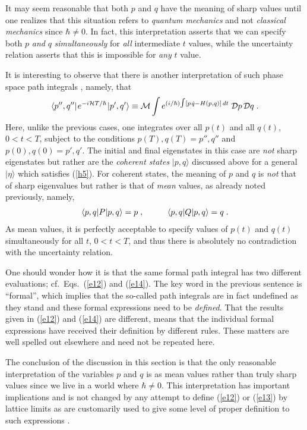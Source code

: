 \documentclass[12pt]{article}
\def\H{{\cal H}}
\def\D{{\cal D}}
\def\tint{{\textstyle\int}}
\def\s{\hskip.08em}
\def\bn{\begin{eqnarray}}     %
\def\en{\end{eqnarray}}       %
\def\<{\langle}
\def\>{\rangle}
\begin{document}
It may seem reasonable that both $p$ and $q$ have the meaning of sharp 
values until one realizes that this situation refers to 
{\it quantum mechanics} and not {\it classical mechanics} since 
$\hbar\not=0$. In fact, this interpretation asserts that we can specify 
both $p$ {\it and} $q$ {\it simultaneously} for {\it all} intermediate 
$t$ values, while the uncertainty relation asserts that this is impossible 
for {\it any} $t$ value. 

It is interesting to observe that there is another interpretation of 
such phase space path integrals \cite{kla60,klabs}, namely, that
  \bn \<p'',q''|\s e^{-i\H T/\hbar}\s|p',q'\>\equiv {\cal M}\int 
e^{(i/\hbar)\tint[p\s{\dot q}-H(p,q)]\,dt}\;\D p\,\D q\;.   \label{e14}\en
Here, unlike the previous cases, one integrates over all $p(t)$ and all 
$q(t)$,
$0<t<T$, subject to the conditions $p(T),q(T)=p'',q''$ and $p(0),q(0)=p',q'$.
The initial and final eigenstates in this case are {\it not} sharp 
eigenstates but rather are the {\it coherent states} $|p,q\>$ discussed 
above for a general $|\eta\>$ which satisfies (\ref{h5}). For coherent 
states, the meaning of $p$ and $q$ is {\it not} that of sharp eigenvalues 
but rather is that of {\it mean} values, as already noted previously, 
namely,
  \bn  \<p,q|P|p,q\>=p\;,\hskip1cm \<p,q|Q|p,q\>=q\;. \en
As mean values, it is perfectly acceptable to specify values of $p(t)$ 
and $q(t)$ simultaneously for all $t$, $0<t<T$, and thus there is absolutely 
no contradiction with the uncertainty relation.

One should wonder how it is that the same formal path integral has two 
different evaluations; cf.~Eqs.~(\ref{e12}) and (\ref{e14}). The key word 
in the previous sentence is ``formal'', which implies that the so-called 
path integrals are in fact undefined as they stand and these formal 
expressions need to be {\it defined}. That the results given in 
(\ref{e12}) and (\ref{e14}) are different, means that the individual 
formal expressions have received their definition by different rules. 
These matters are well spelled out elsewhere \cite{kla13} and need not be 
repeated here.

The conclusion of the discussion in this section is that the only 
reasonable interpretation of the variables $p$ and $q$ is as mean values 
rather than truly sharp values since we live in a world where 
$\hbar\not=0$. This interpretation has important implications and is 
not changed by any attempt to define (\ref{e12}) or (\ref{e13}) by 
lattice limits as are customarily used to give some level of proper 
definition to such expressions \cite{swe}. 
\end{document}
